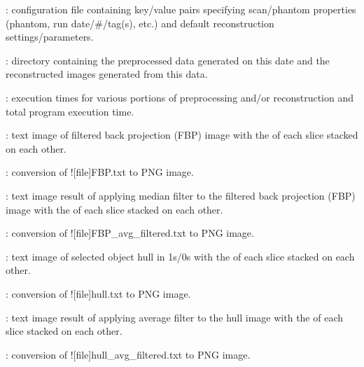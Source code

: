 \begin{tcbenvironment}
\begin{tcbparagraph}
\begin{ThinEnum}
\begin{ThinEnum}
\begin{ThinEnum}
\begin{ThinEnum}
\begin{ThinEnum}
\begin{ThinEnum}
\begin{ThinEnum}
                                	\begin{ThinEnum}
                                    	\item {} : configuration file containing key/value pairs specifying scan/phantom properties
                                    (phantom, run date/\#/tag(s), etc.) and default reconstruction settings/parameters.
                    				\item {} : directory containing the preprocessed data generated on this date and the reconstructed images generated from this data.                    			
                    			\begin{ThinEnum}
                                        	\item {} : execution times for various portions of preprocessing and/or reconstruction and total program execution time.
                                        	\item {} : text image of filtered back projection (FBP) image with the \xyplane* of each slice stacked on each other.
                                        	\item {} : conversion of \docentry![file]{FBP.txt} to PNG image.
                                        	\item {} : text image result of applying median filter to the filtered back projection (FBP) image with the \xyplane* of each slice stacked on each other.
                                        	\item {} : conversion of \docentry![file]{FBP\_avg\_filtered.txt} to PNG image.
                                        	\item {} : text image of selected object hull in 1s/0s with the \xyplane* of each slice stacked on each other.
                                        	\item {} : conversion of \docentry![file]{hull.txt} to PNG image.
                                        	\item {} : text image result of applying average filter to the hull image with the \xyplane* of each slice stacked on each other.
							\item {} : conversion of \docentry![file]{hull\_avg\_filtered.txt} to PNG image.

\end{ThinEnum}
\end{ThinEnum}
\end{ThinEnum}
\end{ThinEnum}
\end{ThinEnum}
\end{ThinEnum}
\end{ThinEnum}
\end{ThinEnum}
\end{ThinEnum}
\end{tcbparagraph}
\end{tcbenvironment}
